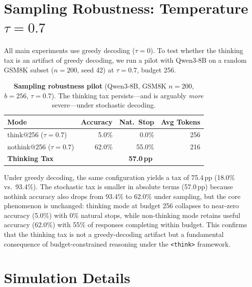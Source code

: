 \section{Sampling Robustness: Temperature $\tau{=}0.7$}
\label{app:sampling-robustness}

All main experiments use greedy decoding ($\tau{=}0$).
To test whether the thinking tax is an artifact of greedy decoding, we run a pilot with Qwen3-8B on a random GSM8K subset ($n{=}200$, seed 42) at $\tau{=}0.7$, budget 256.

\begin{table}[ht]
\centering
\small
\caption{\textbf{Sampling robustness pilot} (Qwen3-8B, GSM8K $n{=}200$, $b{=}256$, $\tau{=}0.7$).
The thinking tax persists---and is arguably \emph{more} severe---under stochastic decoding.}
\label{tab:sampling-pilot}
\begin{tabular}{lrrr}
\toprule
\textbf{Mode} & \textbf{Accuracy} & \textbf{Nat.\ Stop} & \textbf{Avg Tokens} \\
\midrule
think@256 ($\tau{=}0.7$)   & 5.0\%  & 0.0\%  & 256 \\
nothink@256 ($\tau{=}0.7$) & 62.0\% & 55.0\% & 216 \\
\midrule
\textbf{Thinking Tax}      & \multicolumn{3}{c}{\textbf{57.0\,pp}} \\
\bottomrule
\end{tabular}
\end{table}

Under greedy decoding, the same configuration yields a tax of 75.4\,pp (18.0\% vs.\ 93.4\%).
The stochastic tax is smaller in absolute terms (57.0\,pp) because nothink accuracy also drops from 93.4\% to 62.0\% under sampling, but the core phenomenon is unchanged: thinking mode at budget 256 collapses to near-zero accuracy (5.0\%) with 0\% natural stops, while non-thinking mode retains useful accuracy (62.0\%) with 55\% of responses completing within budget.
This confirms that the thinking tax is not a greedy-decoding artifact but a fundamental consequence of budget-constrained reasoning under the \texttt{<think>} framework.

\section{\method{} Simulation Details}
\label{app:town-simulation}

